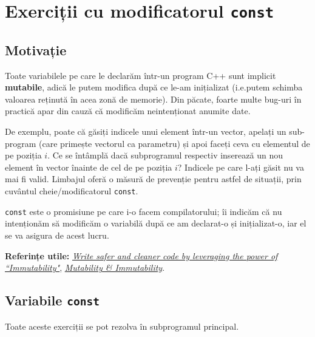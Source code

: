 \section*{Exerciții cu modificatorul \texorpdfstring{\texttt{const}}{const}}

\subsection*{Motivație}

Toate variabilele pe care le declarăm într-un program C++ sunt implicit \textbf{mutabile}, adică le putem modifica după ce le-am inițializat (i.e.\@ putem schimba valoarea reținută în acea zonă de memorie). Din păcate, foarte multe bug-uri în practică apar din cauză că modificăm neintenționat anumite date.

De exemplu, poate că găsiți indicele unui element într-un vector, apelați un sub-program (care primește vectorul ca parametru) și apoi faceți ceva cu elementul de pe poziția \(i\). Ce se întâmplă dacă subprogramul respectiv inserează un nou element în vector înainte de cel de pe poziția \(i\)? Indicele pe care l-ați găsit nu va mai fi valid. Limbajul oferă o măsură de prevenție pentru astfel de situații, prin cuvântul cheie/modificatorul \texttt{const}.

\texttt{const} este o promisiune pe care i-o facem compilatorului; îi indicăm că nu intenționăm să modificăm o variabilă după ce am declarat-o și inițializat-o, iar el se va asigura de acest lucru.

\textbf{Referințe utile:} \href{https://www.freecodecamp.org/news/write-safer-and-cleaner-code-by-leveraging-the-power-of-immutability-7862df04b7b6/}{\textit{Write safer and cleaner code by leveraging the power of ``Immutability"}}, \href{https://web.mit.edu/6.005/www/fa15/classes/09-immutability/}{\textit{Mutability \& Immutability}}.

\subsection*{Variabile \texorpdfstring{\texttt{const}}{const}}

Toate aceste exerciții se pot rezolva în subprogramul principal.

